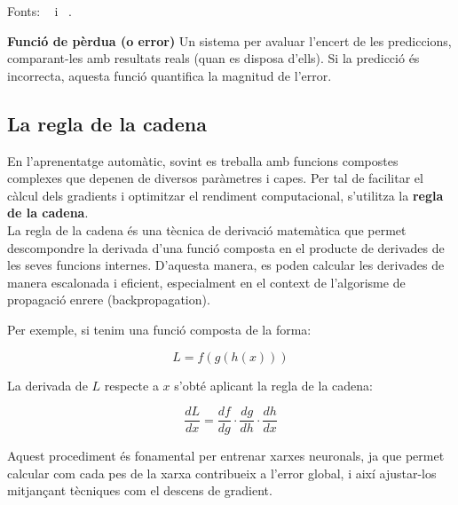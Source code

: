             Fonts: ~\cite{IBM_Gradient} i ~\cite{Video_Gradient}.

 \textbf{Funció de pèrdua (o error)}\label{subsec:pèrdua}
     \hspace*{-1\leftmargin} Un sistema per avaluar l'encert de les prediccions, comparant-les amb resultats reals (quan es disposa d'ells). Si la predicció és incorrecta, aquesta funció quantifica la magnitud de l'error.
\subsection{La regla de la cadena}\label{subsec:cadena}

En l'aprenentatge automàtic, sovint es treballa amb funcions compostes complexes que depenen de diversos paràmetres i capes. Per tal de facilitar el càlcul dels gradients i optimitzar el rendiment computacional, s'utilitza la \textbf{regla de la cadena}.\\

La regla de la cadena és una tècnica de derivació matemàtica que permet descompondre la derivada d'una funció composta en el producte de derivades de les seves funcions internes. D’aquesta manera, es poden calcular les derivades de manera escalonada i eficient, especialment en el context de l’algorisme de propagació enrere (backpropagation).

Per exemple, si tenim una funció composta de la forma:

\[
L = f(g(h(x)))
\]

La derivada de \( L \) respecte a \( x \) s'obté aplicant la regla de la cadena:

\[
\frac{dL}{dx} = \frac{df}{dg} \cdot \frac{dg}{dh} \cdot \frac{dh}{dx}
\]

Aquest procediment és fonamental per entrenar xarxes neuronals, ja que permet calcular com cada pes de la xarxa contribueix a l'error global, i així ajustar-los mitjançant tècniques com el descens de gradient.


